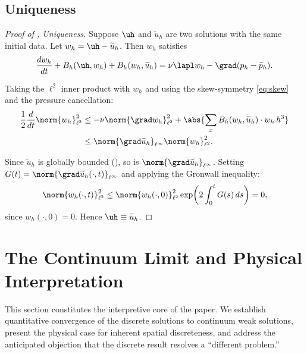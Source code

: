 \documentclass[12pt, a4paper]{article}
\theoremstyle{plain}
\theoremstyle{definition}
\begin{document}
\subsection{Uniqueness}

\begin{proof}[Proof of , Uniqueness]
  Suppose $\uh$ and $\widetilde{u}_h$ are two solutions with the same
  initial data. Let $w_h = \uh - \widetilde{u}_h$. Then $w_h$ satisfies
  \begin{equation}
    \frac{dw_h}{dt} + B_h(\uh, w_h) + B_h(w_h, \widetilde{u}_h)
    = \nu\lapl w_h - \grad(p_h - \widetilde{p}_h).
  \end{equation}

  Taking the $\ell^2$ inner product with $w_h$ and using the skew-symmetry
  \eqref{eq:skew} and the pressure cancellation:
  \begin{align}
    \frac{1}{2}\frac{d}{dt}\norm{w_h}_{\ell^2}^2
    &\leq -\nu\norm{\grad w_h}_{\ell^2}^2
      + \abs{\sum_{x} B_h(w_h, \widetilde{u}_h) \cdot w_h \, h^3} \notag \\
    &\leq \norm{\grad\widetilde{u}_h}_{\ell^\infty} \norm{w_h}_{\ell^2}^2.
  \end{align}

  Since $\widetilde{u}_h$ is globally bounded (), so is
  $\norm{\grad\widetilde{u}_h}_{\ell^\infty}$. Setting
  $G(t) = \norm{\grad\widetilde{u}_h(\cdot,t)}_{\ell^\infty}$ and applying
  the Gronwall inequality:
  \begin{equation}
    \norm{w_h(\cdot,t)}_{\ell^2}^2
    \leq \norm{w_h(\cdot,0)}_{\ell^2}^2 \exp\!\left(2\int_0^t G(s)\,ds\right) = 0,
  \end{equation}
  since $w_h(\cdot, 0) = 0$. Hence $\uh \equiv \widetilde{u}_h$.
\end{proof}

\section{The Continuum Limit and Physical Interpretation}\label{sec:continuum}

This section constitutes the interpretive core of the paper. We establish
quantitative convergence of the discrete solutions to continuum weak solutions,
present the physical case for inherent spatial discreteness, and address the
anticipated objection that the discrete result resolves a ``different problem.''
\end{document}
